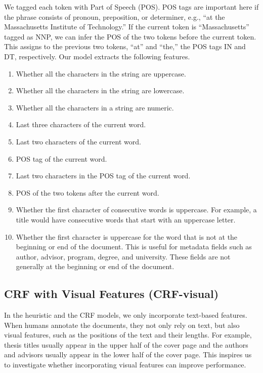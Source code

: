 \documentclass{article}
\begin{document}
We tagged each token with Part of Speech (POS). POS tags are important here if the phrase consists of pronoun, preposition, or determiner, e.g., ``at the Massachusetts Institute of Technology.'' If the current token is ``Massachusetts'' tagged as NNP, we can infer the POS of the two tokens before the current token. This assigns to the previous two tokens, ``at'' and ``the,'' the POS tags IN and DT, respectively. Our model extracts the following features.

\begin{enumerate}
    \item Whether all the characters in the string are uppercase.
    \item Whether all the characters in the string are lowercase.
    \item Whether all the characters in a string are numeric. 
    \item Last three characters of the current word.
    \item Last two characters of the current word.
    \item POS tag of the current word.
    \item Last two characters in the POS tag of the current word.
    \item POS of the two tokens after the current word. 
    \item Whether the first character of consecutive words is uppercase. For example, a title would have consecutive words that start with an uppercase letter.
    \item Whether the first character is uppercase for the word that is not at the beginning or end of the document. This is useful for metadata fields such as author, advisor, program, degree, and university. These fields are not generally at the beginning or end of the document.
\end{enumerate}

\subsection{CRF with Visual Features (CRF-visual)}
In the heuristic and the CRF models, we only incorporate text-based features. When humans annotate the documents, they not only rely on text, but also visual features, such as the positions of the text and their lengths. For example, thesis titles usually appear in the upper half of the cover page and the authors and advisors usually appear in the lower half of the cover page. This inspires us to investigate whether incorporating visual features can improve performance.
\end{document}
